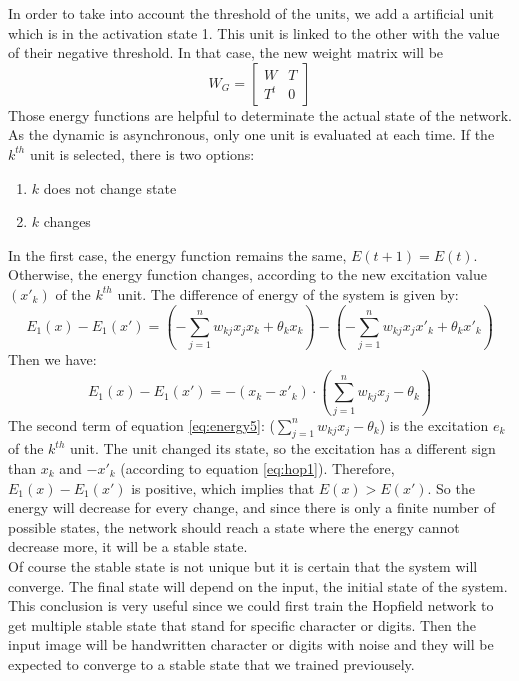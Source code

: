 In order to take into account the threshold of the units, we add a artificial unit which is in the activation state 1. This unit is linked to the other with the value of their negative threshold. In that case, the new weight matrix will be
\begin{equation}
\label{eq:energy3}
W_G = \begin{bmatrix}W & T \\T^t & 0 \end{bmatrix}
\end{equation}
Those energy functions are helpful to determinate the actual state of the network.\\

As the dynamic is asynchronous, only one unit is evaluated at each time. If the $k^{th}$ unit is selected, there is two options:

\begin{enumerate}
  \item $k$ does not change state
  \item $k$ changes 
\end{enumerate}
In the first case, the energy function remains the same, $E(t + 1) = E(t)$. Otherwise, the energy function changes, according to the new excitation value $(x'_k)$ of the $k^{th}$ unit. The difference of energy of the system is given by:
\begin{equation}
\label{eq:energy4}
E_1(x) - E_1(x') = (-\sum_{j = 1}^{n}w_{kj} x_j x_k + \theta_k x_k) - (-\sum_{j = 1}^{n} w_{kj} x_j x'_k + \theta_k x'_{k})
\end{equation}
Then we have:
\begin{equation}
\label{eq:energy5}
E_1(x) - E_1(x') = -(x_k - x'_k) \cdot (\sum_{j = 1}^{n} w_{kj}x_j - \theta_k)
\end{equation}
The second term of equation \ref{eq:energy5}: ($\sum_{j = 1}^{n} w_{kj}x_j - \theta_k$) is the excitation $e_k$ of the $k^{th}$ unit. The unit changed its state, so the excitation has a different sign than $x_k$ and $-x'_k$ (according to equation \ref{eq:hop1}). Therefore, $E_1(x) - E_1(x')$ is positive, which implies that $E(x) > E(x')$.  So the energy will decrease for every change, and since there is only a finite number of possible states, the network should reach a state where the energy cannot decrease more, it will be a stable state.\\

Of course the stable state is not unique but it is certain that the system will converge. The final state will depend on the input, the initial state of the system. This conclusion is very useful since we could first train the Hopfield network to get multiple stable state that stand for specific character or digits. Then the input image will be handwritten character or digits with noise and they will be expected to converge to a stable state that we trained previousely. \\

